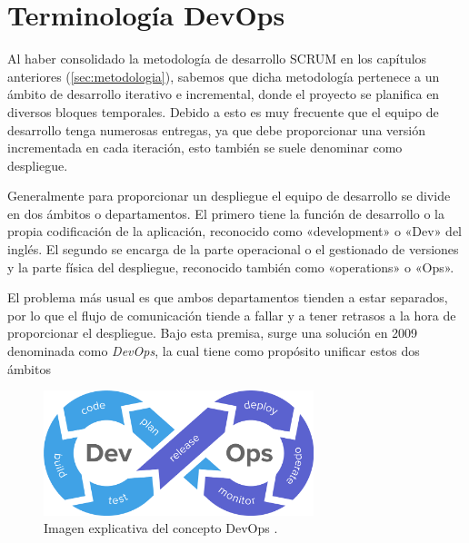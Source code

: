 \chapter{Terminología DevOps}\label{ch:devops}
Al haber consolidado la metodología de desarrollo SCRUM en los capítulos anteriores (\ref{sec:metodologia}), sabemos que dicha metodología pertenece a un ámbito de desarrollo iterativo e incremental, donde el proyecto se planifica en diversos bloques temporales. Debido a esto es muy frecuente que el equipo de desarrollo tenga numerosas entregas, ya que debe proporcionar una versión incrementada en cada iteración, esto también se suele denominar como despliegue.

\vspace{0.3cm}

Generalmente para proporcionar un despliegue el equipo de desarrollo se divide en dos ámbitos o departamentos. El primero tiene la función de desarrollo o la propia codificación de la aplicación, reconocido como «development» o «Dev» del inglés. El segundo se encarga de la parte operacional o el gestionado de versiones y la parte física del despliegue, reconocido también como «operations» o «Ops». \cite{redahat-devops}

\vspace{0.3cm}

El problema más usual es que ambos departamentos tienden a estar separados, por lo que el flujo de comunicación tiende a fallar y a tener retrasos a la hora de proporcionar el despliegue. Bajo esta premisa, surge una solución en 2009 denominada como \textit{DevOps}, la cual tiene como propósito unificar estos dos ámbitos \cite{redahat-devops}

\vspace{0.3cm}

\begin{figure}[H]
    \centering
    \myfloatalign
    \includegraphics[width=0.7\textwidth]{gfx/devops-explicativo.png}
    \caption[Imagen explicativa del concepto DevOps]{Imagen explicativa del concepto DevOps \cite{azure-devops}.}\label{gfx:devops-explicativo}
\end{figure}

